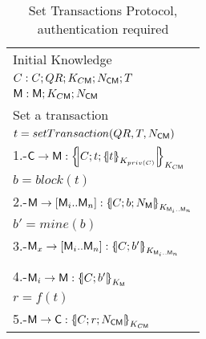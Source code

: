 \begin{table}[htb]
\footnotesize
\begin{center}
\caption{Set Transactions Protocol, authentication required}
\label{table:ProtSetTrans}
\begin{tabular}{|l|}
\hline
           Initial Knowledge                                                             \\
            $C:C; QR ;  K_{C\textsf{M}} ; N_{\textsf{C}\textsf{M}} ; T$               \\
            $\textsf{M}: \textsf{M}; K_{C\textsf{M}} ; N_{\textsf{C}\textsf{M}}$    \\ \hline \hline 
           Set a transaction                                                                        \\
           \hspace{5mm} $t=setTransaction(QR,T,N_{\textsf{C}\textsf{M}})$                                  \\  
           1.-$\Client\rightarrow \Server: \fat{C \lnk t \lnk \fat{t}_{K_{priv(C)}}}_{K_{C\Server}}$          \\ 
           \hspace{5mm} $b=block(t)$                                  \\  
           2.-$\Server\rightarrow [\Server_i .. \Server_n]: \fat{C \lnk b \lnk N_\Server}_{K_{\Server_i .. \Server_n}}$          \\ 
           \hspace{5mm} $b'=mine(b)$                                  \\  
           3.-$\Server_x\rightarrow [\Server_i .. \Server_n]: \fat{C \lnk b'}_{K_{\Server_i .. \Server_n}}$          \\            
                                             \\  
           4.-$\Server_i\rightarrow \Server: \fat{C \lnk b'}_{K_{\Server}}$          \\            
           \hspace{5mm} $r=f(t)$                                  \\  
           5.-$\Server\rightarrow \Client: \fat{C \lnk r \lnk N_{\Client\Server}}_{K_{C\Server}}$       \\  \hline \hline
\end{tabular}
\end{center}
\end{table}
\normalsize
